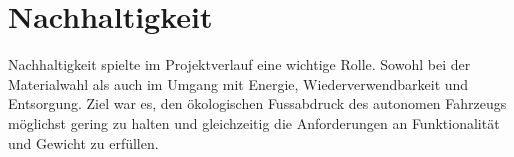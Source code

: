 \documentclass[main.tex]{subfiles} %
\begin{document}

\section{Nachhaltigkeit}

Nachhaltigkeit spielte im Projektverlauf eine wichtige Rolle. Sowohl bei der 
Materialwahl als auch im Umgang mit Energie, Wiederverwendbarkeit und Entsorgung. 
Ziel war es, den ökologischen Fussabdruck des autonomen Fahrzeugs möglichst gering 
zu halten und gleichzeitig die Anforderungen an Funktionalität und Gewicht zu erfüllen.


\newpage






\end{document}
